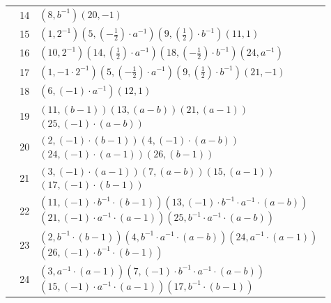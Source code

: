 \begin{longtable}{@{}r>{\raggedright\arraybackslash}p{0.91\linewidth}@{}}
14 & \((8,b^{-1})\)\allowbreak\quad \((20,-1)\)\\
15 & \((1,2^{-1})\)\allowbreak\quad \((5,\left(-\frac{1}{2}\right) \cdot a^{-1})\)\allowbreak\quad \((9,\left(\frac{1}{2}\right) \cdot b^{-1})\)\allowbreak\quad \((11,1)\)\\
16 & \((10,2^{-1})\)\allowbreak\quad \((14,\left(\frac{1}{2}\right) \cdot a^{-1})\)\allowbreak\quad \((18,\left(-\frac{1}{2}\right) \cdot b^{-1})\)\allowbreak\quad \((24,a^{-1})\)\\
17 & \((1,-1 \cdot 2^{-1})\)\allowbreak\quad \((5,\left(-\frac{1}{2}\right) \cdot a^{-1})\)\allowbreak\quad \((9,\left(\frac{1}{2}\right) \cdot b^{-1})\)\allowbreak\quad \((21,-1)\)\\
18 & \((6,\left(-1\right) \cdot a^{-1})\)\allowbreak\quad \((12,1)\)\\
19 & \((11,(b - 1))\)\allowbreak\quad \((13,(a - b))\)\allowbreak\quad \((21,(a - 1))\)\allowbreak\quad \((25,\left(-1\right) \cdot (a - b))\)\\
20 & \((2,\left(-1\right) \cdot (b - 1))\)\allowbreak\quad \((4,\left(-1\right) \cdot (a - b))\)\allowbreak\quad \((24,\left(-1\right) \cdot (a - 1))\)\allowbreak\quad \((26,(b - 1))\)\\
21 & \((3,\left(-1\right) \cdot (a - 1))\)\allowbreak\quad \((7,(a - b))\)\allowbreak\quad \((15,(a - 1))\)\allowbreak\quad \((17,\left(-1\right) \cdot (b - 1))\)\\
22 & \((11,\left(-1\right) \cdot b^{-1} \cdot (b - 1))\)\allowbreak\quad \((13,\left(-1\right) \cdot b^{-1} \cdot a^{-1} \cdot (a - b))\)\allowbreak\quad \((21,\left(-1\right) \cdot a^{-1} \cdot (a - 1))\)\allowbreak\quad \((25,b^{-1} \cdot a^{-1} \cdot (a - b))\)\\
23 & \((2,b^{-1} \cdot (b - 1))\)\allowbreak\quad \((4,b^{-1} \cdot a^{-1} \cdot (a - b))\)\allowbreak\quad \((24,a^{-1} \cdot (a - 1))\)\allowbreak\quad \((26,\left(-1\right) \cdot b^{-1} \cdot (b - 1))\)\\
24 & \((3,a^{-1} \cdot (a - 1))\)\allowbreak\quad \((7,\left(-1\right) \cdot b^{-1} \cdot a^{-1} \cdot (a - b))\)\allowbreak\quad \((15,\left(-1\right) \cdot a^{-1} \cdot (a - 1))\)\allowbreak\quad \((17,b^{-1} \cdot (b - 1))\)\\
\end{longtable}
\endgroup

